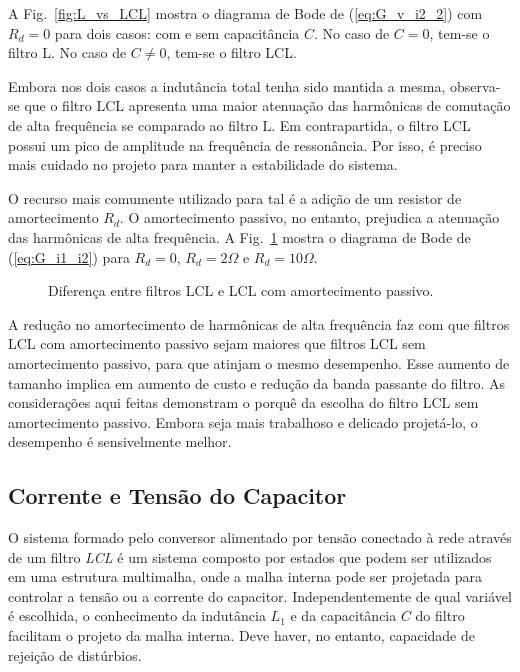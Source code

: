   A Fig.~\ref{fig:L_vs_LCL} mostra o diagrama de Bode de (\ref{eq:G_v_i2_2}) com $R_d = 0$ para dois casos: com e sem capacitância $C$. No caso de $C = 0$, tem-se o filtro L. No caso de $C \neq 0$, tem-se o filtro LCL.

  Embora nos dois casos a indutância total tenha sido mantida a mesma, observa-se que o filtro LCL apresenta uma maior atenuação das harmônicas de comutação de alta frequência se comparado ao filtro L. Em contrapartida, o filtro LCL possui um pico de amplitude na frequência de ressonância. Por isso, é preciso mais cuidado no projeto para manter a estabilidade do sistema.

  O recurso mais comumente utilizado para tal é a adição de um resistor de amortecimento $R_d$. O amortecimento passivo, no entanto, prejudica a atenuação das harmônicas de alta frequência. A Fig.~\ref{fig:R_in_LCL} mostra o diagrama de Bode de (\ref{eq:G_i1_i2}) para $R_d = 0$, $R_d = 2\Omega$ e $R_d = 10\Omega$.

  \begin{figure}[htb]
    \centering{
      \def\svgwidth{\textwidth}
      }
    \caption{Diferença entre filtros LCL e LCL com amortecimento passivo.}
    \label{fig:R_in_LCL}
  \end{figure}

  A redução no amortecimento de harmônicas de alta frequência faz com que filtros LCL com amortecimento passivo sejam maiores que filtros LCL sem amortecimento passivo, para que atinjam o mesmo desempenho. Esse aumento de tamanho implica em aumento de custo e redução da banda passante do filtro. As considerações aqui feitas demonstram o porquê da escolha do filtro LCL sem amortecimento passivo. Embora seja mais trabalhoso e delicado projetá-lo, o desempenho é sensivelmente melhor.


\subsection{Corrente e Tensão do Capacitor}

  O sistema formado pelo conversor alimentado por tensão conectado à rede através de um filtro \emph{LCL} é um sistema composto por estados que podem ser utilizados em uma estrutura multimalha, onde a malha interna pode ser projetada para controlar a tensão ou a corrente do capacitor. Independentemente de qual variável é escolhida, o conhecimento da indutância $L_1$ e da capacitância $C$ do filtro facilitam o projeto da malha interna. Deve haver, no entanto, capacidade de rejeição de distúrbios.

